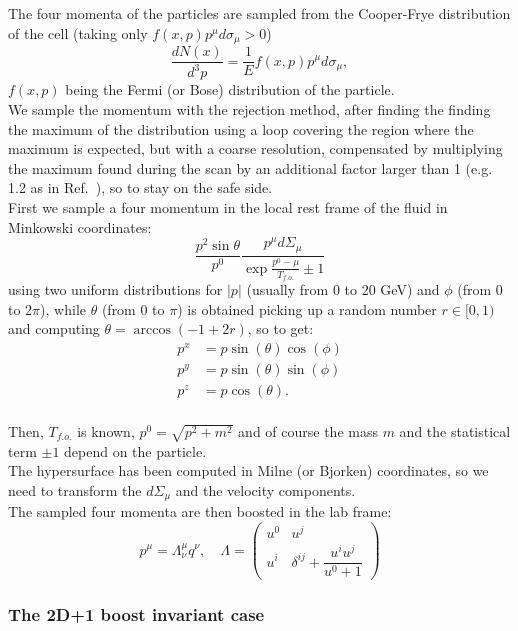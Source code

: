 \documentclass[12pt, a4paper]{report}
\begin{document}
	The four momenta of the particles are sampled from the 
	Cooper-Frye distribution of the cell (taking only  
	$f(x,p) p^\mu d\sigma_{\mu} >0$)
	\begin{equation}
	\frac{d N(x)}{d^3p} = \frac{1}{E} f(x,p) p^\mu d\sigma_{\mu},
	\end{equation}
	$f(x,p)$ being the Fermi (or Bose) distribution of the particle.\\
	We sample the momentum with the rejection method, after finding the finding the maximum of
	the distribution using a loop covering the region where the maximum is expected, but with a coarse resolution, compensated by multiplying the maximum found during the scan by an additional factor larger than 1 (e.g.  1.2 as in Ref.~\cite{Huovinen:2012is}), so to stay on the safe side.\\
    First we sample a four momentum in the local rest frame of the fluid in Minkowski coordinates:
	\begin{equation}
	\dfrac{p^2 \sin{\theta}}{p^0}\dfrac{p^{\mu}d\Sigma_{\mu}}{\exp{\frac{p^0-\mu}{T_{f.o.}}}\pm 1}
	\label{mycf}
	\end{equation}
	using two uniform distributions for $|p|$ (usually from 0 to 20 GeV) and $\phi$ (from 0 to $2\pi$), while $\theta$ (from 0 to $\pi$) is obtained picking up a random number $r\in [0,1)$ and computing $\theta=\arccos(-1+2r)$, so to get:
	\begin{align}
	p^x&=p\sin(\theta)\cos(\phi)\\
	p^y&=p\sin(\theta)\sin(\phi)\\
	p^z&=p\cos(\theta).\\
	\end{align}
	
	Then, $T_{f.o.}$ is known, $p^0=\sqrt{p^2+m^2}$ and of course the mass $m$ and the statistical term $\pm 1$ depend on the particle.\\
	The hypersurface has been computed in Milne (or Bjorken) coordinates, so we need to transform the $d\Sigma_{\mu}$ and the velocity components.\\	
	The sampled four momenta are then boosted in the lab frame:
	\begin{equation}
	p^{\mu}=\Lambda^{\mu}_{\nu}q^{\nu}, \quad \Lambda=
	\begin{pmatrix} u^0 & u^j\\ u^i & \delta^{ij}+\dfrac{u^i u^j}{u^0+1}\end{pmatrix}
	\end{equation}
	\subsubsection{The 2D+1 boost invariant case}
\end{document}
